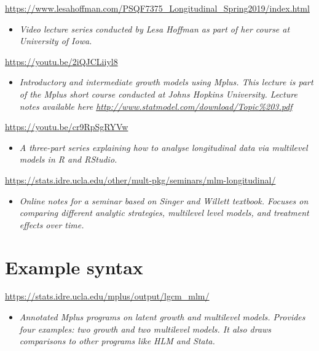 \documentclass[
]{book}
\providecommand{\tightlist}{%
  \setlength{\itemsep}{0pt}\setlength{\parskip}{0pt}}
\begin{document}
\url{https://www.lesahoffman.com/PSQF7375_Longitudinal_Spring2019/index.html}

\begin{itemize}
\tightlist
\item
  \emph{Video lecture series conducted by Lesa Hoffman as part of her course at University of Iowa. }
\end{itemize}

\url{https://youtu.be/2iQJCLiiyl8}

\begin{itemize}
\tightlist
\item
  \emph{Introductory and intermediate growth models using Mplus. This lecture is part of the Mplus short course conducted at Johns Hopkins University. Lecture notes available here \url{http://www.statmodel.com/download/Topic\%203.pdf} }
\end{itemize}

\url{https://youtu.be/cr9RpSgRYVw}

\begin{itemize}
\tightlist
\item
  \emph{A three-part series explaining how to analyse longitudinal data via multilevel models in R and RStudio.}
\end{itemize}

\url{https://stats.idre.ucla.edu/other/mult-pkg/seminars/mlm-longitudinal/}

\begin{itemize}
\tightlist
\item
  \emph{Online notes for a seminar based on Singer and Willett textbook. Focuses on comparing different analytic strategies, multilevel level models, and treatment effects over time. }
\end{itemize}

\section{Example syntax}\label{example-syntax}

\url{https://stats.idre.ucla.edu/mplus/output/lgcm_mlm/}

\begin{itemize}
\tightlist
\item
  \emph{Annotated Mplus programs on latent growth and multilevel models. Provides four examples: two growth and two multilevel models. It also draws comparisons to other programs like HLM and Stata. }
\end{itemize}
\end{document}
